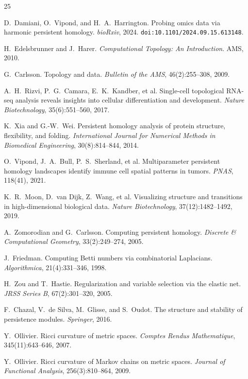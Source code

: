 \documentclass[11pt]{article}
\begin{document}

\begin{thebibliography}{25}

D.~Damiani, O.~Vipond, and H.~A.~Harrington.
Probing omics data via harmonic persistent homology.
\emph{bioRxiv}, 2024.
\texttt{doi:10.1101/2024.09.15.613148}.

H.~Edelsbrunner and J.~Harer.
\emph{Computational Topology: An Introduction}.
AMS, 2010.

G.~Carlsson.
Topology and data.
\emph{Bulletin of the AMS}, 46(2):255--308, 2009.

A.~H.~Rizvi, P.~G.~Camara, E.~K.~Kandber, et al.
Single-cell topological RNA-seq analysis reveals insights into cellular differentiation and development.
\emph{Nature Biotechnology}, 35(6):551--560, 2017.

K.~Xia and G.-W.~Wei.
Persistent homology analysis of protein structure, flexibility, and folding.
\emph{International Journal for Numerical Methods in Biomedical Engineering}, 30(8):814--844, 2014.

O.~Vipond, J.~A.~Bull, P.~S.~Sherland, et al.
Multiparameter persistent homology landscapes identify immune cell spatial patterns in tumors.
\emph{PNAS}, 118(41), 2021.

K.~R.~Moon, D.~van Dijk, Z.~Wang, et al.
Visualizing structure and transitions in high-dimensional biological data.
\emph{Nature Biotechnology}, 37(12):1482--1492, 2019.

A.~Zomorodian and G.~Carlsson.
Computing persistent homology.
\emph{Discrete \& Computational Geometry}, 33(2):249--274, 2005.

J.~Friedman.
Computing Betti numbers via combinatorial Laplacians.
\emph{Algorithmica}, 21(4):331--346, 1998.

H.~Zou and T.~Hastie.
Regularization and variable selection via the elastic net.
\emph{JRSS Series B}, 67(2):301--320, 2005.

F.~Chazal, V.~de Silva, M.~Glisse, and S.~Oudot.
The structure and stability of persistence modules.
\emph{Springer}, 2016.

Y.~Ollivier.
Ricci curvature of metric spaces.
\emph{Comptes Rendus Mathematique}, 345(11):643--646, 2007.

Y.~Ollivier.
Ricci curvature of Markov chains on metric spaces.
\emph{Journal of Functional Analysis}, 256(3):810--864, 2009.


\end{thebibliography}
\end{document}
